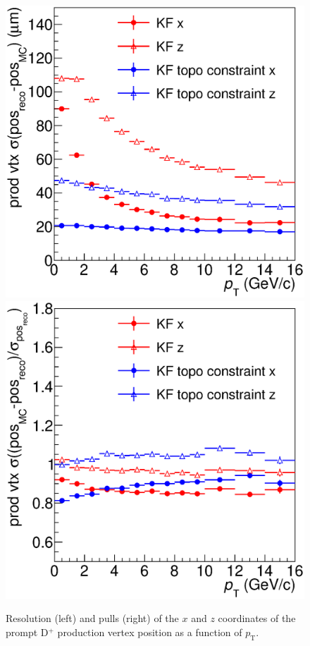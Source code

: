 \documentclass[b5paper,10pt,twoside,oldstyle,classica]{toptesi}
\newcommand{\pt}{p_\text{T}}
\begin{document}
\begin{figure}[tb]
\begin{center}
{\includegraphics[scale = 0.28]{ResPVXZ.eps}}
\hspace{0.cm}
{\includegraphics[scale = 0.28]{PullsPVXZ.eps}}
\caption{Resolution (left) and pulls (right) of the $x$ and $z$ coordinates of the prompt D$^+$ production vertex position as a function of $\pt$.}
\label{KF_prodvtx}
\end{center}
\end{figure} 
\end{document}
